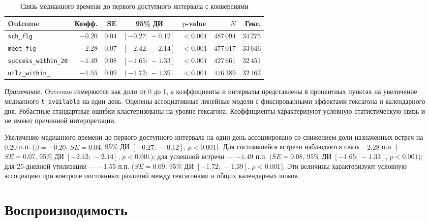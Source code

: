 \documentclass[14pt,a4paper]{extarticle}
\begin{document}
\begin{table}[H]
\centering
\caption{Связь медианного времени до первого доступного интервала с конверсиями}
\label{tab:speed_conversion_fe}
\footnotesize
\setlength{\tabcolsep}{2.5pt}
\renewcommand{\arraystretch}{1.12}
\begin{tabularx}{\textwidth}{@{}>{\raggedright\arraybackslash}X r r c c r r@{}}
\toprule
Outcome & Коэфф. & SE & 95\% ДИ & \(p\)-value & \(N\) & Гекс. \\
\midrule
\texttt{sch\_flg} & \(-0.20\) & \(0.04\) & \([-0.27;\,-0.12]\) & \(<0.001\) & \(487\,094\) & \(34\,275\) \\
\texttt{meet\_flg} & \(-2.28\) & \(0.07\) & \([-2.42;\,-2.14]\) & \(<0.001\) & \(477\,017\) & \(33\,646\) \\
\texttt{success\_within\_20} & \(-1.49\) & \(0.08\) & \([-1.65;\,-1.33]\) & \(<0.001\) & \(427\,661\) & \(32\,451\) \\
\texttt{utlz\_\allowbreak within\_\allowbreak 25} & \(-1.55\) & \(0.09\) & \([-1.72;\,-1.39]\) & \(<0.001\) & \(416\,389\) & \(32\,162\) \\
\bottomrule
\end{tabularx}
\begin{minipage}{0.98\textwidth}
\scriptsize
\textit{Примечание.} Outcome измеряются как доли от 0 до 1, а коэффициенты и
интервалы представлены в процентных пунктах на увеличение медианного
\texttt{t\_available} на один день. Оценены ассоциативные линейные модели с
фиксированными эффектами гексагона и календарного дня. Робастные стандартные
ошибки кластеризованы на уровне гексагона. Коэффициенты характеризуют условную
статистическую связь и не имеют причинной интерпретации.
\end{minipage}
\end{table}

Увеличение медианного времени до первого доступного интервала на один день
ассоциировано со снижением доли назначенных встреч на \(0.20\) п.п.
(\(\widehat{\beta}=-0.20\), \(SE=0.04\), 95\% ДИ \([-0.27;\,-0.12]\),
\(p<0.001\)). Для состоявшейся встречи наблюдается связь \(-2.28\) п.п.
(\(SE=0.07\), 95\% ДИ \([-2.42;\,-2.14]\), \(p<0.001\)); для успешной
встречи --- \(-1.49\) п.п. (\(SE=0.08\), 95\% ДИ
\([-1.65;\,-1.33]\), \(p<0.001\)); для 25-дневной утилизации ---
\(-1.55\) п.п. (\(SE=0.09\), 95\% ДИ \([-1.72;\,-1.39]\),
\(p<0.001\)). Эти величины характеризуют условную ассоциацию при контроле
постоянных различий между гексагонами и общих календарных шоков.

\section{Воспроизводимость}
\end{document}
